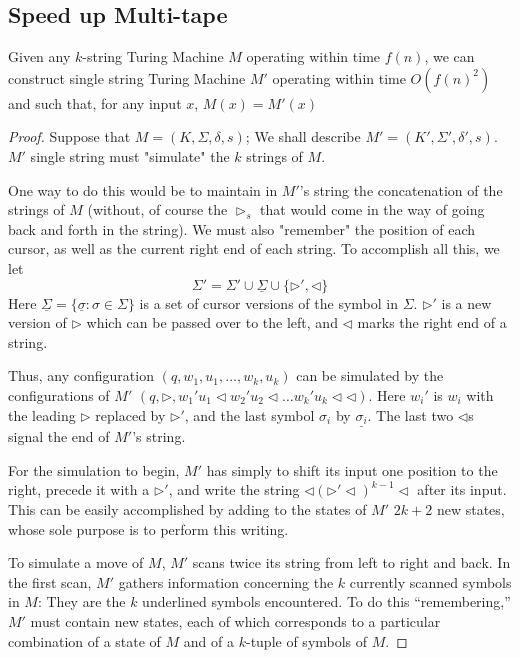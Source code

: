 \documentclass[12pt]{article}
\newcommand{\uSigma}{\underline\Sigma}
\newcommand{\usigma}{\underline\sigma}
\newcommand{\tr}{\triangleright}
\newcommand{\tl}{\triangleleft}
\begin{document}
\subsection{Speed up Multi-tape}

\begin{defbox}
  Given any $k$-string Turing Machine $M$ operating within time $f(n)$, we can construct single string Turing Machine $M'$ operating within time $O(f(n)^2)$ and such that, for any input $x$, $M(x)=M'(x)$
\end{defbox}
\begin{proof}
Suppose that $M=(K,\Sigma,\delta,s)$; We shall describe $M'=(K',\Sigma',\delta',s)$. 
  $M'$ single string must "simulate" the $k$ strings of $M$. 
  
  One way to do this would be to maintain in $M'$'s string the concatenation of the strings of $M$ (without, of course the $\tr_s$ that would come in the way of going back and forth in the string). We must also "remember" the position of each cursor, as well as the current right end of each string.
  To accomplish all this, we let $$\Sigma'=\Sigma'\cup\uSigma\cup\{\tr',\tl\}$$ Here $\uSigma=\{\usigma:\sigma\in\Sigma\}$ is a set of cursor versions of the symbol in $\Sigma$.
  $\tr'$ is a new version of $\tr$ which can be passed over to the left, and $\tl$ marks the right end of a string.
  
  Thus, any configuration $(q,w_1,u_1,\dots,w_k,u_k)$ can be simulated by the configurations of $M'$ $(q,\tr,w_1'u_1\tl w_2'u_2\tl\dots w_k'u_k\tl\tl)$. Here $w_i'$ is $w_i$ with the leading $\triangleright$ replaced by $\triangleright'$, and the last symbol $\sigma_i$ by $\underline{\sigma_i}$. The last two $\triangleleft$s signal the end of $M'$'s string.

  For the simulation to begin, $M'$ has simply to shift its input one position to the right, precede it with a $\triangleright'$, and write the string 
  $ \triangleleft (\triangleright' \triangleleft)^{k-1} \triangleleft$
  after its input. This can be easily accomplished by adding to the states of $M'$ $2k + 2$ new states, whose sole purpose is to perform this writing.
  
  To simulate a move of $M$, $M'$ scans twice its string from left to right and back. In the first scan, $M'$ gathers information concerning the $k$ currently scanned symbols in $M$: They are the $k$ underlined symbols encountered. To do this ``remembering,'' $M'$ must contain new states, each of which corresponds to a particular combination of a state of $M$ and of a $k$-tuple of symbols of $M$.
  

\end{proof}
\end{document}
